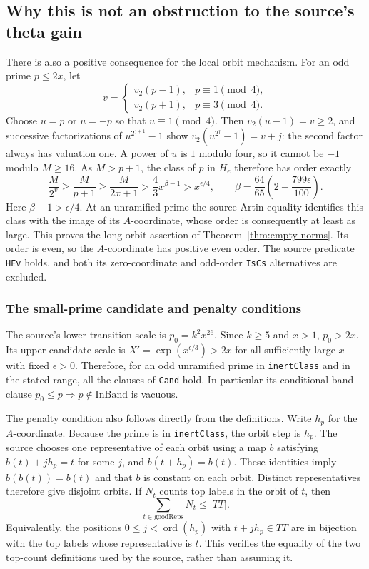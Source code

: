\subsection{Why this is not an obstruction to the source's theta gain}

There is also a positive consequence for the local orbit mechanism.
For an odd prime $p\le2x$, let
\[
 v=\begin{cases}v_2(p-1),&p\equiv1\pmod4,\\
                 v_2(p+1),&p\equiv3\pmod4.
   \end{cases}
\]
Choose $u=p$ or $u=-p$ so that $u\equiv1\pmod4$. Then
$v_2(u-1)=v\ge2$, and successive factorizations of
$u^{2^{j+1}}-1$ show
$v_2(u^{2^j}-1)=v+j$: the second factor always has valuation one.
A power of $u$ is $1$ modulo four, so it cannot be $-1$ modulo
$M\ge16$. As $M>p+1$, the class of $p$ in $H_e$ therefore has
order exactly
\[
 \frac M{2^v}\ge\frac M{p+1}\ge\frac M{2x+1}
   >\frac43x^{\beta-1}>x^{\epsilon/4},\qquad
 \beta=\frac{64}{65}\left(2+\frac{799\epsilon}{100}\right).
                                                        \tag{2.7}
\]
Here $\beta-1>\epsilon/4$. At an unramified prime the source
Artin equality identifies this class with the image of its
$A$-coordinate, whose order is consequently at least as large.
This proves the long-orbit assertion of
Theorem~\ref{thm:empty-norms}. Its order is even, so the
$A$-coordinate has positive even order. The source predicate
\texttt{HEv} holds, and both its zero-coordinate and odd-order
\texttt{IsCs} alternatives are excluded.

\subsubsection*{The small-prime candidate and penalty conditions}

The source's lower transition scale is $p_0=k^2x^{26}$. Since
$k\ge5$ and $x>1$, $p_0>2x$. Its upper candidate scale is
$X'=\exp(x^{\epsilon/3})>2x$ for all sufficiently large $x$
with fixed $\epsilon>0$. Therefore, for an odd unramified prime
in \texttt{inertClass} and in the stated range, all the clauses
of \texttt{Cand} hold. In particular its conditional band clause
$p_0\le p\Rightarrow p\notin\mathrm{InBand}$ is vacuous.

The penalty condition also follows directly from the definitions.
Write $h_p$ for the $A$-coordinate. Because the prime is in
\texttt{inertClass}, the orbit step is $h_p$. The source chooses
one representative of each orbit using a map $b$ satisfying
$b(t)+j h_p=t$ for some $j$, and $b(t+h_p)=b(t)$.
These identities imply $b(b(t))=b(t)$ and that $b$ is constant
on each orbit. Distinct representatives therefore give disjoint
orbits. If $N_t$ counts top labels in the orbit of $t$, then
\[
               \sum_{t\in\mathrm{goodReps}}N_t\le |TT|.
                                                        \tag{2.8}
\]
Equivalently, the positions $0\le j<\operatorname{ord}(h_p)$
with $t+jh_p\in TT$ are in bijection with the top labels whose
representative is $t$. This verifies the equality of the two
top-count definitions used by the source, rather than assuming it.

